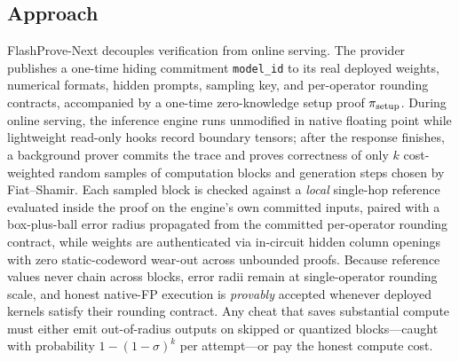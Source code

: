 \documentclass[10pt]{article}
\begin{document}
\subsection{Approach}
FlashProve-Next decouples verification from online serving. The provider publishes a one-time hiding commitment \texttt{model\_\allowbreak{}id} to its real deployed weights, numerical formats, hidden prompts, sampling key, and per-operator rounding contracts, accompanied by a one-time zero-knowledge setup proof $\pi_{\rm setup}$. During online serving, the inference engine runs unmodified in native floating point while lightweight read-only hooks record boundary tensors; after the response finishes, a background prover commits the trace and proves correctness of only $k$ cost-weighted random samples of computation blocks and generation steps chosen by Fiat--Shamir. Each sampled block is checked against a \emph{local} single-hop reference evaluated inside the proof on the engine's own committed inputs, paired with a box-plus-ball error radius propagated from the committed per-operator rounding contract, while weights are authenticated via in-circuit hidden column openings with zero static-codeword wear-out across unbounded proofs. Because reference values never chain across blocks, error radii remain at single-operator rounding scale, and honest native-FP execution is \emph{provably} accepted whenever deployed kernels satisfy their rounding contract. Any cheat that saves substantial compute must either emit out-of-radius outputs on skipped or quantized blocks---caught with probability $1-(1-\sigma)^k$ per attempt---or pay the honest compute cost.
\end{document}
